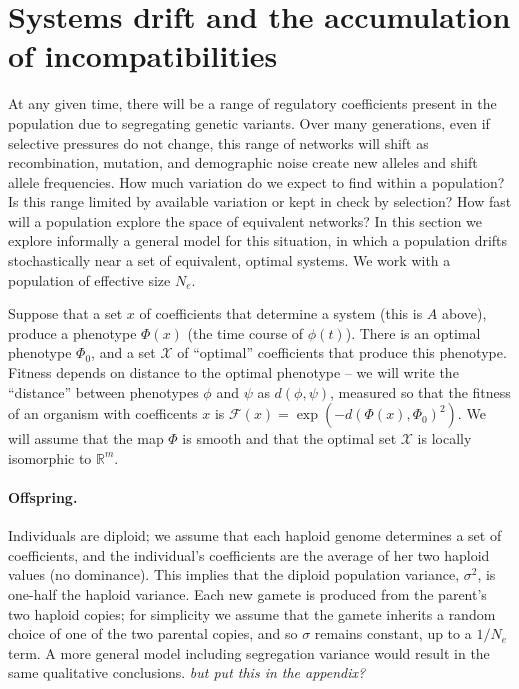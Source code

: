 \documentclass{article}
\newcommand{\plr}[1]{\todo[color=blue!25]{#1}}
\newcommand{\plri}[1]{{\color{blue}\it #1}}
\newcommand{\plr}[1]{{\color{blue}\it #1}}
\newcommand{\plri}[1]{\plr{#1}}
\newcommand{\R}{\mathbb{R}}
\newcommand{\1}{\mathbbm{1}}
\newcommand{\fitx}{\mathcal{F}}
\newcommand{\optx}{\mathcal{X}}
\newcommand{\optph}{\Phi_0}
\newcommand{\dph}{d}
\begin{document}
\section*{Systems drift and the accumulation of incompatibilities}

At any given time, there will be a range of regulatory coefficients present in the population
due to segregating genetic variants.
Over many generations, even if selective pressures do not change,
this range of networks will shift 
as recombination, mutation, and demographic noise create new alleles and shift allele frequencies.
How much variation do we expect to find within a population?
Is this range limited by available variation or kept in check by selection?
How fast will a population explore the space of equivalent networks?
In this section we explore informally a general model for this situation,
in which a population drifts stochastically near a set of equivalent, optimal systems.
We work with a population of effective size $N_e$.

Suppose that a set $x$ of coefficients that determine a system (this is $A$ above),
produce a phenotype $\Phi(x)$ (the time course of $\phi(t)$).
There is an optimal phenotype $\optph$,
and a set $\optx$ of ``optimal'' coefficients that produce this phenotype.
Fitness depends on distance to the optimal phenotype --
we will write the ``distance'' between phenotypes $\phi$ and $\psi$ as $\dph(\phi, \psi)$,
measured so that the fitness of an organism with coefficents $x$ is $\fitx(x) = \exp(-\dph(\Phi(x),\optph)^2)$.
We will assume that the map $\Phi$ is smooth
and that the optimal set $\optx$ is locally isomorphic to $\R^m$.
\plr{say that better}

\paragraph{Offspring.}
Individuals are diploid; we assume that each haploid genome determines a set of coefficients,
and the individual's coefficients are the average of her two haploid values (no dominance).
This implies that the diploid population variance, $\sigma^2$, is one-half the haploid variance.
Each new gamete is produced from the parent's two haploid copies;
for simplicity we assume that the gamete inherits a random choice of one of the two parental copies,
and so $\sigma$ remains constant, up to a $1/N_e$ term.
A more general model including segregation variance \citep{barton_infinitesimal}
would result in the same qualitative conclusions.
\plri{but put this in the appendix?}
\end{document}
